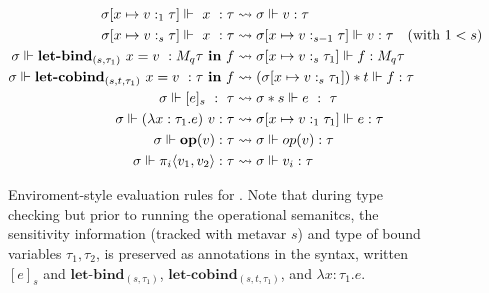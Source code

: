 \begin{figure}
\begin{center}
\begin{equation*}
  \begin{aligned}[c]
    \sigma[x \mapsto v :_1 \tau] \Vdash \ x \ : \tau &\rightsquigarrow 
    \sigma \Vdash v : \tau \\
    \sigma[x \mapsto v :_{s} \tau] \Vdash \ x \ : \tau &\rightsquigarrow
    \sigma[x \mapsto v :_{s-1} \tau] \Vdash v : \tau \quad{(\text{with } 1 < s)}
    \\
    \sigma \Vdash \textbf{let-bind}_{(s, \tau_1)} \ x = v \ : M_{q} \tau \ \textbf{in} \ f &\rightsquigarrow \sigma[x
    \mapsto v :_s \tau_1]
    \Vdash f : M_q \tau \\
    \sigma \Vdash \textbf{let-cobind}_{(s, t, \tau_1)} \ x = v \ : \tau \ \textbf{in} \ f &\rightsquigarrow (\sigma[x
    \mapsto v :_s \tau_1]) * t
    \Vdash f : \tau \\
    \sigma \Vdash [e]_s \ : \ \tau &\rightsquigarrow \sigma * s \Vdash e \ : \ \tau \\
    \sigma \Vdash (\lambda x : \tau_1 .e) \ v : \tau &\rightsquigarrow \sigma[x
    \mapsto v :_1 \tau_1] \Vdash e : \tau \\
    \sigma \Vdash \mathbf{op}(v) : \tau &\rightsquigarrow \sigma \Vdash op(v) :
    \tau \\
    \sigma \Vdash \pi_i\langle v_1,v_2 \rangle : \tau &\rightsquigarrow \sigma
    \Vdash v_i : \tau \\ 
  \end{aligned}
\end{equation*}

\end{center}
    \caption{Enviroment-style evaluation rules for \Lang. Note that during type
    checking but prior to running the operational semanitcs, the sensitivity
    information (tracked with metavar $s$) and type of bound variables $\tau_1,
    \tau_2$, is preserved as annotations in the syntax, written $[e]_s$ and
    $\textbf{let-bind}_{(s, \tau_1)}$, $\textbf{let-cobind}_{(s, t, \tau_1)}$,
    and $\lambda x : \tau_1 . e $.}
    \label{fig:sub_eval_rules}
\end{figure}
